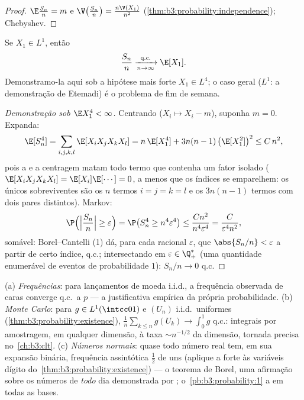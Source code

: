 \begin{proof}
$\E\frac{S_n}n = m$ e $\V\bigl(\frac{S_n}n\bigr) =
\frac{n\V(X_1)}{n^2}$ (\cref{thm:b3:probability:independence}); Chebyshev.
\end{proof}

\begin{theorem}
\label{thm:b3:probability:slln}
Se $X_1 \in L^1$, então
\[
\frac{S_n}{n} \xrightarrow[n\to\infty]{\text{q.c.}} \E[X_1].
\]
Demonstramo-la aqui sob a hipótese mais forte $X_1 \in
L^4$; o caso geral
($L^1$: a demonstração de Etemadi) é o problema de fim de semana.
\end{theorem}

\begin{proof}[Demonstração sob $\E X_1^4 < \infty$]
Centrando ($X_i \mapsto X_i - m$), suponha $m = 0$. Expanda:
\[
\E[S_n^4] = \sum_{i,j,k,l}\E[X_iX_jX_kX_l]
= n\,\E[X_1^4] + 3n(n-1)\,\bigl(\E[X_1^2]\bigr)^2 \leq
C\,n^2 ,
\]
pois a  e a centragem matam todo termo que contenha um
fator isolado ($\E[X_iX_jX_kX_l] =
\E[X_i]\E[\cdots] = 0$, a menos que os índices se emparelhem: os únicos
sobreviventes são os $n$ termos $i=j=k=l$ e os $3n(n-1)$ termos com dois
pares distintos). Markov:
\[
\P\Bigl(\Bigl|\frac{S_n}n\Bigr| \geq \varepsilon\Bigr)
= \P\bigl(S_n^4 \geq n^4\varepsilon^4\bigr)
\leq \frac{Cn^2}{n^4\varepsilon^4} =
\frac{C}{\varepsilon^4n^2},
\]
somável: Borel--Cantelli (1) dá, para cada racional $\varepsilon$, que $\abs{S_n/n} < \varepsilon$ a
partir de certo índice, q.c.; intersectando em $\varepsilon \in \Q_+^*$ (uma quantidade
enumerável de eventos de probabilidade $1$): $S_n/n \to 0$ q.c.
\end{proof}

\begin{example}
\label{ex:b3:probability:sllnapps}
(a) \emph{Frequências}: para lançamentos de moeda i.i.d., a frequência
observada de caras converge q.c.\ a $p$ --- a justificativa empírica
da própria probabilidade.
(b) \emph{Monte Carlo}: para $g \in
L^1(\intcc01)$ e
$(U_n)$ i.i.d.\ uniformes (\cref{thm:b3:probability:existence}), $\frac1n\sum_{k\leq n}g(U_k) \to \int_0^1g$ q.c.: integrais por
amostragem, em qualquer dimensão, à taxa $\sim n^{-1/2}$  da dimensão,
tornada precisa no~\cref{ch:b3:clt}.
(c) \emph{Números normais}: quase todo número real tem, em sua expansão
binária, frequência assintótica $\frac12$ de uns (aplique a  forte às
variáveis dígito do~\cref{thm:b3:probability:existence}) --- o teorema de Borel, uma
afirmação sobre os números de \emph{todo} dia demonstrada por ; o~\cref{pb:b3:probability:1} a  em todas as bases.
\end{example}

